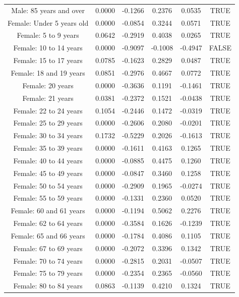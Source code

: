 \documentclass{article} %
\begin{document}
\begin{table}[H]
\begin{adjustbox}{width = \textwidth}
\begin{tabular}{cccccc}
  Male: 85 years and over & 0.0000 & -0.1266 & 0.2376 & 0.0535 & TRUE \\ 
  Female: Under 5 years old & 0.0000 & -0.0854 & 0.3244 & 0.0571 & TRUE \\ 
  Female: 5 to 9 years & 0.0642 & -0.2919 & 0.4038 & 0.0265 & TRUE \\ 
  Female: 10 to 14 years & 0.0000 & -0.9097 & -0.1008 & -0.4947 & FALSE \\ 
  Female: 15 to 17 years & 0.0785 & -0.1623 & 0.2829 & 0.0487 & TRUE \\ 
  Female: 18 and 19 years & 0.0851 & -0.2976 & 0.4667 & 0.0772 & TRUE \\ 
  Female: 20 years & 0.0000 & -0.3636 & 0.1191 & -0.1461 & TRUE \\ 
  Female: 21 years & 0.0381 & -0.2372 & 0.1521 & -0.0438 & TRUE \\ 
  Female: 22 to 24 years & 0.1054 & -0.2446 & 0.1472 & -0.0319 & TRUE \\ 
  Female: 25 to 29 years & 0.0000 & -0.2606 & 0.2080 & -0.0201 & TRUE \\ 
  Female: 30 to 34 years & 0.1732 & -0.5229 & 0.2026 & -0.1613 & TRUE \\ 
  Female: 35 to 39 years & 0.0000 & -0.1611 & 0.4163 & 0.1265 & TRUE \\ 
  Female: 40 to 44 years & 0.0000 & -0.0885 & 0.4475 & 0.1260 & TRUE \\ 
  Female: 45 to 49 years & 0.0000 & -0.0847 & 0.3460 & 0.1258 & TRUE \\ 
  Female: 50 to 54 years & 0.0000 & -0.2909 & 0.1965 & -0.0274 & TRUE \\ 
  Female: 55 to 59 years & 0.0000 & -0.1331 & 0.2360 & 0.0520 & TRUE \\ 
  Female: 60 and 61 years & 0.0000 & -0.1194 & 0.5062 & 0.2276 & TRUE \\ 
  Female: 62 to 64 years & 0.0000 & -0.3584 & 0.1626 & -0.1239 & TRUE \\ 
  Female: 65 and 66 years & 0.0000 & -0.1784 & 0.4086 & 0.1105 & TRUE \\ 
  Female: 67 to 69 years & 0.0000 & -0.2072 & 0.3396 & 0.1342 & TRUE \\ 
  Female: 70 to 74 years & 0.0000 & -0.2815 & 0.2031 & -0.0507 & TRUE \\ 
  Female: 75 to 79 years & 0.0000 & -0.2354 & 0.2365 & -0.0560 & TRUE \\ 
  Female: 80 to 84 years & 0.0863 & -0.1139 & 0.4210 & 0.1324 & TRUE \\ 

\end{tabular}
\end{adjustbox}
\end{table}
\end{document}
